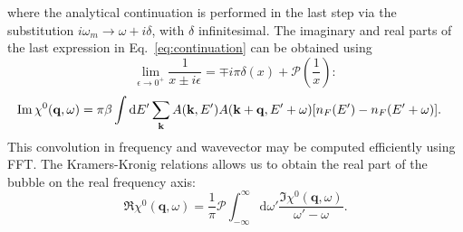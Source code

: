 \documentclass[preprint,prb,amsmath,superscriptaddress,showpacs]{revtex4}
\newcommand{\bk}{\mathbf{k}}
\newcommand{\bq}{\mathbf{q}}
\begin{document}
where the analytical continuation is performed in the last step via the
substitution $i\omega_m \rightarrow \omega + i\delta$, with $\delta$
infinitesimal. The imaginary and real parts of the last expression in
Eq.~\ref{eq:continuation} can be obtained using
%
\begin{equation}
  \lim_{\epsilon \rightarrow 0^{+}} \frac{1}{x \pm i\epsilon} = \mp
  i\pi\delta (x) + \mathcal{P}\left( \frac{1}{x} \right):
\end{equation}
%
\begin{equation}
  \begin{aligned}
    \Im \chi^0(\bq, \omega)
    &= \pi \beta
    \int
    \mathrm{d} E'
    \sum_{\bk} A(\bk, E') 
    A(\bk + \bq, E' + \omega)
    \qty[n_F(E') - n_F(E' + \omega) ].
    \end{aligned}
\end{equation}
This convolution in frequency and wavevector may be computed
efficiently using FFT. The Kramers-Kronig relations allows us
to obtain the real part of the bubble on the real frequency axis:
%
\begin{equation}
  \Re \chi^0(\bq, \omega) =
  \dfrac{1}{\pi} \mathcal{P}
  \int_{-\infty}^{\infty}
  \mathrm{d} \omega' \frac{\Im \chi^0(\bq, \omega)}{\omega' - \omega}.
\end{equation}
%

\iffalse
Using RPA approximation we can further write spectral function
$A(\mathbf{k}, E)$ as
%
\begin{equation}
A(\mathbf{k}, E) = - \frac{1}{\pi} \mathrm{Im} (G_{\mathrm{ret}}(\mathbf{k}, E)) =
\frac{1}{\pi} \frac{-\mathrm{Im}(\Sigma)}{\left( E -
    \varepsilon_{\mathbf{k}} + \mu - \mathrm{Re}(\Sigma) \right)^2 + (\mathrm{Im}(\Sigma))^2}.
\end{equation}
%
Here, $\Sigma$ marks RPA self-energy.
\fi


\end{document}
